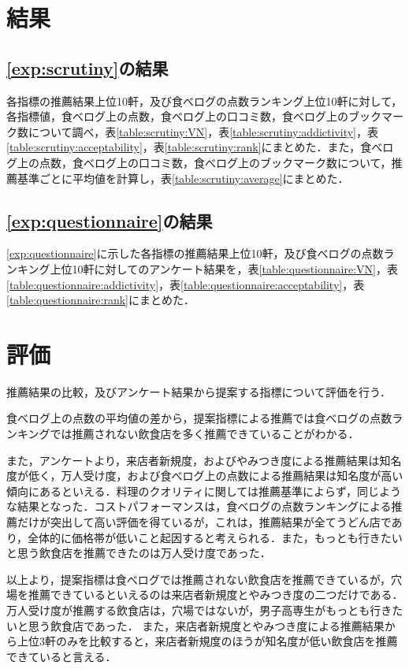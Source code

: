 \section{結果}
	\subsection{\ref{exp:scrutiny}の結果}
	各指標の推薦結果上位10軒，及び食べログの点数ランキング上位10軒に対して，各指標値，食べログ上の点数，食べログ上の口コミ数，食べログ上のブックマーク数について調べ，表\ref{table:scrutiny:VN}，表\ref{table:scrutiny:addictivity}，表\ref{table:scrutiny:acceptability}，表\ref{table:scrutiny:rank}にまとめた．また，食べログ上の点数，食べログ上の口コミ数，食べログ上のブックマーク数について，推薦基準ごとに平均値を計算し，表\ref{table:scrutiny:average}にまとめた．
	
	
	
	
	
	\newpage

	\subsection{\ref{exp:questionnaire}の結果}
	\ref{exp:questionnaire}に示した各指標の推薦結果上位10軒，及び食べログの点数ランキング上位10軒に対してのアンケート結果を，表\ref{table:questionnaire:VN}，表\ref{table:questionnaire:addictivity}，表\ref{table:questionnaire:acceptability}，表\ref{table:questionnaire:rank}にまとめた．
	
	
	
	
\section{評価}
推薦結果の比較，及びアンケート結果から提案する指標について評価を行う．\par
食べログ上の点数の平均値の差から，提案指標による推薦では食べログの点数ランキングでは推薦されない飲食店を多く推薦できていることがわかる．\par
また，アンケートより，来店者新規度，およびやみつき度による推薦結果は知名度が低く，万人受け度，および食べログ上の点数による推薦結果は知名度が高い傾向にあるといえる．料理のクオリティに関しては推薦基準によらず，同じような結果となった．コストパフォーマンスは，食べログの点数ランキングによる推薦だけが突出して高い評価を得ているが，これは，推薦結果が全てうどん店であり，全体的に価格帯が低いこと起因すると考えられる．また，もっとも行きたいと思う飲食店を推薦できたのは万人受け度であった．\par
以上より，提案指標は食べログでは推薦されない飲食店を推薦できているが，穴場を推薦できているといえるのは来店者新規度とやみつき度の二つだけである．万人受け度が推薦する飲食店は，穴場ではないが，男子高専生がもっとも行きたいと思う飲食店であった．
また，来店者新規度とやみつき度による推薦結果から上位3軒のみを比較すると，来店者新規度のほうが知名度が低い飲食店を推薦できていると言える．
